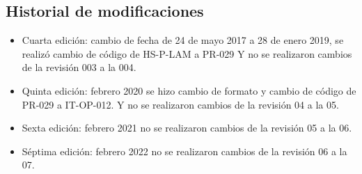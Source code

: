 \subsection{Historial de modificaciones}

\begin{itemize}
	\item Cuarta edición: cambio de fecha de 24 de mayo 2017 a 28 de enero 2019, se realizó cambio de código de HS-P-LAM a PR-029 Y no se realizaron cambios de la revisión 003 a la 004.
	\item Quinta edición: febrero 2020 se hizo cambio de formato y cambio de código de PR-029 a IT-OP-012. Y no se realizaron cambios de la revisión 04 a la 05.
	\item Sexta edición: febrero 2021 no se realizaron cambios de la revisión 05 a la 06.
	\item Séptima edición: febrero 2022 no se realizaron cambios de la revisión 06 a la 07.
\end{itemize}
